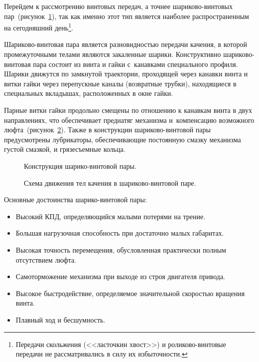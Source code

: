 Перейдем к рассмотрению винтовых передач, а точнее шариково-винтовых пар~(рисунок~\cref{fig:ballscrew}), так как именно этот тип является наиболее распространенным на сегодняшний день\footnote{Передачи скольжения (<<ласточкин хвост>>) и роликово-винтовые передачи не рассматривались в силу их избыточности.}.

Шариково-винтовая пара является разновидностью передачи качения, в которой промежуточными телами являются закаленные шарики. Конструктивно шариково-винтовая пара состоит из винта и гайки с~канавками специального профиля. Шарики движутся по замкнутой траектории, проходящей через канавки винта и витки гайки через перепускные каналы (возвратные трубки), находящиеся в специальных вкладышах, расположенных в окне гайки.

Парные витки гайки продольно смещены по отношению к канавкам винта в двух направлениях, что обеспечивает преднатяг механизма и~компенсацию возможного люфта~(рисунок~\cref{fig:ballscrew-1}). Также в конструкции шариково-винтовой пары предусмотрены лубрикаторы, обеспечивающие постоянную смазку механизма густой смазкой, и грязесъемные кольца.

\begin{figure}[ht]
	\caption{Конструкция шарико-винтовой пары.}\label{fig:ballscrew}
\end{figure}

\begin{figure}[ht]
	\caption{Схема движения тел качения в шариково-винтовой паре.}\label{fig:ballscrew-1}
\end{figure}

Основные достоинства шарико-винтовой пары:

\begin{itemize}
	\item Высокий КПД, определяющийся малыми потерями на трение.
	\item Большая нагрузочная способность при достаточно малых габаритах.
	\item Высокая точность перемещения, обусловленная практически полным отсутствием люфта.
	\item Самоторможение механизма при выходе из строя двигателя привода.
	\item Высокое быстродействие, определяемое значительной скоростью вращения винта.
	\item Плавный ход и бесшумность.
\end{itemize}

